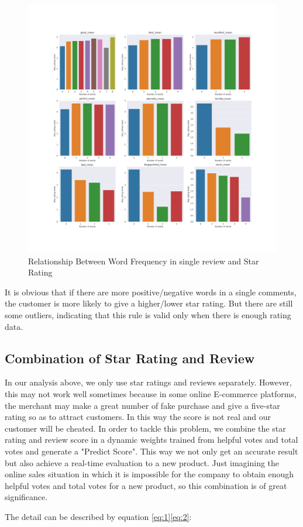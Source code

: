 \documentclass[12pt]{article}  %
\begin{document}
\begin{figure}[H]
\centering
\includegraphics[width=.7\textwidth]{3_3_topwords_mean_score.png}
\caption{Relationship Between Word Frequency in single review and Star Rating}\label{fig:score}
\end{figure}

It is obvious that if there are more positive/negative words in a single comments, the customer is more likely to give a higher/lower star rating. But there are still some outliers, indicating that this rule is valid only when there is enough rating data.



\subsection{Combination of Star Rating and Review}
In our analysis above, we only use star ratings and reviews separately. However, this may not work well sometimes because in some online E-commerce platforms, the merchant may make a great number of fake purchase and give a five-star rating so as to attract customers. In this way the score is not real and our customer will be cheated. In order to tackle this problem, we combine the star rating and review score in a dynamic weights trained from helpful votes and total votes and generate a "Predict Score". This way we not only get an accurate result but also achieve a real-time evaluation to a new product. Just imagining the online sales situation in which it is impossible for the company to obtain enough helpful votes and total votes for a new product, so this combination is of great significance. 

 The detail can be described by equation \eqref{eq:1}\eqref{eq:2}:
\end{document}
